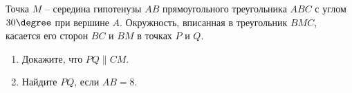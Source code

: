 \begin{ex}
	\begin{condition}
		Точка \( M \) – середина гипотенузы \( AB  \) прямоугольного треугольника \( ABC  \) с углом \( 30\degree\) при вершине \( A \). Окружность, вписанная в треугольник \( BMC \), касается его сторон \( BC  \) и \( BM  \) в точках \( P  \) и \( Q \).
		\begin{enumerate}
			\item Докажите, что \( PQ \parallel CM \).
			\item Найдите \( PQ \), если \( AB=8 \).
		\end{enumerate}
	\end{condition}
\end{ex}